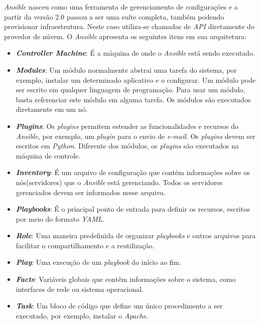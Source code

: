 \textit{Ansible} nasceu como uma ferramenta de gerenciamento de configurações e a partir da versão 2.0 passou a ser uma suíte completa, também podendo provisionar infraestrutura. Neste caso utiliza-se chamadas de \textit{API} diretamente do provedor de núvem. O \textit{Ansible} apresenta os seguintes itens em sua arquitetura:

\hfill
 \begin{itemize}
\item \textbf{\textit{Controller Machine}}: É a máquina de onde o \textit{Ansible} está sendo executado. 

\item \textbf{\textit{Modules}}: Um módulo normalmente abstrai uma tarefa do sistema, por exemplo, instalar um determinado aplicativo e o configurar. Um módulo pode ser escrito em qualquer linguagem de programação. Para usar um módulo, basta referenciar este módulo em alguma tarefa. Os módulos são executados diretamente em um nó.   

\item \textbf{\textit{Plugins}}: Os \textit{plugins} permitem estender as funcionalidades e recursos do \textit{Ansible}, por exemplo, um \textit{plugin} para o envio de \textit{e-mail}. Os \textit{plugins} devem ser escritos em \textit{Python}. Diferente dos módulos, os \textit{plugins} são executados na máquina de controle.

\item \textbf{\textit{Inventory}}: É um arquivo de configuração que contém informações sobre os nós(servidores) que o \textit{Ansible} está gerenciando. Todos os servidores gerenciados devem ser informados nesse arquivo.

\item \textbf{\textit{Playbooks}}: É o principal ponto de entrada para definir os recursos, escritos por meio do formato \textit{YAML}.

\item \textbf{\textit{Role}}: Uma maneira predefinida de organizar \textit{playbooks} e outros arquivos para facilitar o compartilhamento e a reutilização.

\item \textbf{\textit{Play}}: Uma execução de um \textit{playbook} do início ao fim.

\item \textbf{\textit{Facts}}: Variáveis globais que contêm informações sobre o sistema, como interfaces de rede ou sistema operacional.

\item \textbf{\textit{Task}}: Um bloco de código que define um único procedimento a ser executado, por exemplo, instalar o \textit{Apache}.
 \end{itemize}

